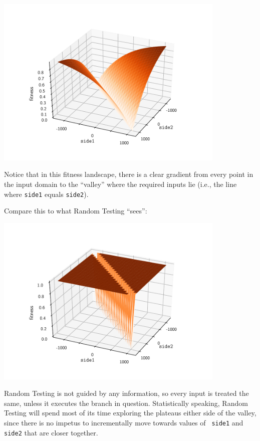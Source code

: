 \begin{center}
    \vspace{-1em}
    \includegraphics[width=11cm]{plots/sbst-side1-equals-side2.pdf}
    \vspace{-1em}
\end{center}

Notice that in this fitness landscape, there is a clear gradient from every
point in the input domain to the ``valley'' where the required inputs lie (i.e.,
the line where {\tt side1} equals {\tt side2}). 

Compare this to what Random Testing ``sees'': 

\begin{center}
    \vspace{-1em}
    \includegraphics[width=11cm]{plots/rt-side1-equals-side2.pdf}
    \vspace{-1em}
\end{center}

Random Testing is not guided by any information, so every input is treated the
same, unless it executes the branch in question. Statistically speaking, Random
Testing will spend most of its time exploring the plateaus either side of the
valley, since there is no impetus to incrementally move towards values of {\tt
side1} and {\tt side2} that are closer together.

